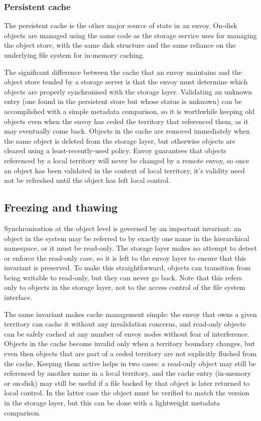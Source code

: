 \subsubsection{Persistent cache}

The persistent cache is the other major source of state in an envoy. On-disk objects are managed using the same code as the storage service uses for managing the object store, with the same disk structure and the same reliance on the underlying file system for in-memory caching.

The significant difference between the cache that an envoy maintains and the object store tended by a storage server is that the envoy must determine which objects are properly synchronised with the storage layer. Validating an unknown entry (one found in the persistent store but whose status is unknown) can be accomplished with a simple metadata comparison, so it is worthwhile keeping old objects even when the envoy has ceded the territory that referenced them, as it may eventually come back. Objects in the cache are removed immediately when the same object is deleted from the storage layer, but otherwise objects are cleared using a least-recently-used policy. Envoy guarantees that objects referenced by a local territory will never be changed by a remote envoy, so once an object has been validated in the context of local territory, it's validity need not be refreshed until the object has left local control.

\subsection{Freezing and thawing}\label{sec:freeze-thaw}

Synchronisation at the object level is governed by an important invariant: an object in the system may be referred to by exactly one name in the hierarchical namespace, or it must be read-only. The storage layer makes no attempt to detect or enforce the read-only case, so it is left to the envoy layer to ensure that this invariant is preserved. To make this straightforward, objects can transition from being writable to read-only, but they can never go back. Note that this refers only to objects in the storage layer, not to the access control of the file system interface.

The same invariant makes cache management simple: the envoy that owns a given territory can cache it without any invalidation concerns, and read-only objects can be safely cached at any number of envoy nodes without fear of interference. Objects in the cache become invalid only when a territory boundary changes, but even then objects that are part of a ceded territory are not explicitly flushed from the cache. Keeping them active helps in two cases: a read-only object may still be referenced by another name in a local territory, and the cache entry (in-memory or on-disk) may still be useful if a file backed by that object is later returned to local control. In the latter case the object must be verified to match the version in the storage layer, but this can be done with a lightweight metadata comparison.

